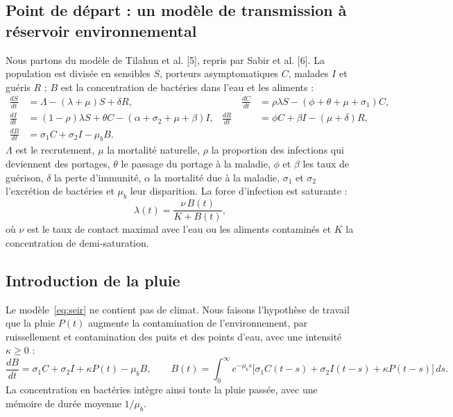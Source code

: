 \documentclass[11pt]{article}
\begin{document}
\subsection{Point de départ : un modèle de transmission à réservoir environnemental}
Nous partons du modèle de Tilahun et al. [5], repris par Sabir et al. [6]. La population est divisée en sensibles $S$, porteurs asymptomatiques $C$, malades $I$ et guéris $R$ ; $B$ est la concentration de bactéries dans l'eau et les aliments :
\begin{equation}
\begin{aligned}
\frac{dS}{dt}&=\Lambda-(\lambda+\mu)S+\delta R, &\qquad \frac{dC}{dt}&=\rho\lambda S-(\phi+\theta+\mu+\sigma_1)C,\\
\frac{dI}{dt}&=(1-\rho)\lambda S+\theta C-(\alpha+\sigma_2+\mu+\beta)I, & \frac{dR}{dt}&=\phi C+\beta I-(\mu+\delta)R,\\
\frac{dB}{dt}&=\sigma_1 C+\sigma_2 I-\mu_b B .
\end{aligned}
\label{eq:seir}
\end{equation}
$\Lambda$ est le recrutement, $\mu$ la mortalité naturelle, $\rho$ la proportion des infections qui deviennent des portages, $\theta$ le passage du portage à la maladie, $\phi$ et $\beta$ les taux de guérison, $\delta$ la perte d'immunité, $\alpha$ la mortalité due à la maladie, $\sigma_1$ et $\sigma_2$ l'excrétion de bactéries et $\mu_b$ leur disparition. La force d'infection est saturante :
\begin{equation}
\lambda(t)=\frac{\nu\,B(t)}{K+B(t)} ,
\label{eq:lambda}
\end{equation}
où $\nu$ est le taux de contact maximal avec l'eau ou les aliments contaminés et $K$ la concentration de demi-saturation.

\subsection{Introduction de la pluie}
Le modèle~\eqref{eq:seir} ne contient pas de climat. Nous faisons l'hypothèse de travail que la pluie $P(t)$ augmente la contamination de l'environnement, par ruissellement et contamination des puits et des points d'eau, avec une intensité $\kappa\ge0$ :
\begin{equation}
\frac{dB}{dt}=\sigma_1 C+\sigma_2 I+\kappa P(t)-\mu_b B,
\qquad
B(t)=\int_0^{\infty}e^{-\mu_b s}\big[\sigma_1C(t-s)+\sigma_2I(t-s)+\kappa P(t-s)\big]\,ds .
\label{eq:pluie}
\end{equation}
La concentration en bactéries intègre ainsi toute la pluie passée, avec une mémoire de durée moyenne $1/\mu_b$.
\end{document}
